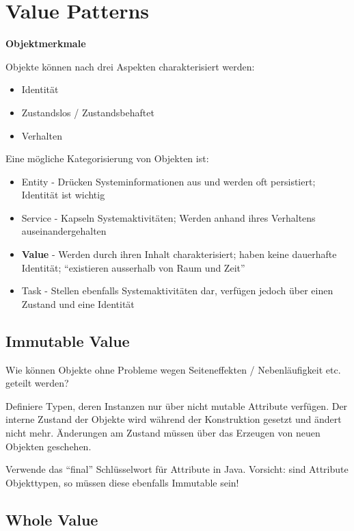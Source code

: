\section{Value Patterns}

\textbf{Objektmerkmale}

Objekte können nach drei Aspekten charakterisiert werden:

\begin{itemize}
	\item Identität
	\item Zustandslos / Zustandsbehaftet
	\item Verhalten
\end{itemize}

Eine mögliche Kategorisierung von Objekten ist:

\begin{itemize}
	\item Entity - Drücken Systeminformationen aus und werden oft persistiert; Identität ist wichtig
	\item Service - Kapseln Systemaktivitäten; Werden anhand ihres Verhaltens auseinandergehalten
	\item \textbf{Value} - Werden durch ihren Inhalt charakterisiert; haben keine dauerhafte Identität; ``existieren ausserhalb von Raum und Zeit''
	\item Task - Stellen ebenfalls Systemaktivitäten dar, verfügen jedoch über einen Zustand und eine Identität
\end{itemize}

\subsection{Immutable Value}

Wie können Objekte ohne Probleme wegen Seiteneffekten / Nebenläufigkeit etc. geteilt werden?

Definiere Typen, deren Instanzen nur über nicht mutable Attribute verfügen. Der interne Zustand der Objekte wird während der Konstruktion gesetzt und ändert nicht mehr. Änderungen am Zustand müssen über das Erzeugen von neuen Objekten geschehen.

Verwende das ``final'' Schlüsselwort für Attribute in Java. Vorsicht: sind Attribute Objekttypen, so müssen diese ebenfalls Immutable sein!

\subsection{Whole Value}

